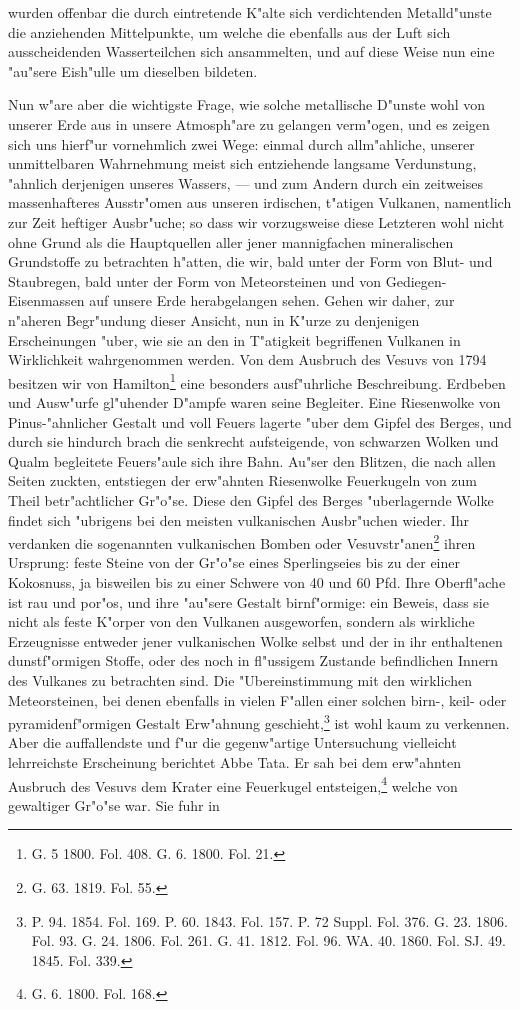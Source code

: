 \documentclass[a4paper, 8pt, oneside, polutonikogreek, german]{article}
\begin{document}
wurden offenbar die durch eintretende K"alte sich verdichtenden Metalld"unste die anziehenden Mittelpunkte, um welche die ebenfalls aus der Luft sich ausscheidenden Wasserteilchen sich ansammelten, und auf diese Weise nun eine "au"sere Eish"ulle um dieselben bildeten.

Nun w"are aber die wichtigste Frage, wie solche metallische D"unste wohl von unserer Erde aus in unsere Atmosph"are zu gelangen verm"ogen, und es zeigen sich uns hierf"ur vornehmlich zwei Wege: einmal durch allm"ahliche, unserer unmittelbaren Wahrnehmung meist sich entziehende langsame Verdunstung, "ahnlich derjenigen unseres Wassers, --- und zum Andern durch ein zeitweises massenhafteres Ausstr"omen aus unseren irdischen, t"atigen Vulkanen, namentlich zur Zeit heftiger Ausbr"uche; so dass wir vorzugsweise diese Letzteren wohl nicht ohne Grund als die Hauptquellen aller jener mannigfachen mineralischen Grundstoffe zu betrachten h"atten, die wir, bald unter der Form von Blut- und Staubregen, bald unter der Form von Meteorsteinen und von Gediegen-Eisenmassen auf unsere Erde herabgelangen sehen. Gehen wir daher, zur n"aheren Begr"undung dieser Ansicht, nun in K"urze zu denjenigen Erscheinungen "uber, wie sie an den in T"atigkeit begriffenen Vulkanen in Wirklichkeit wahrgenommen werden. Von dem Ausbruch des Vesuvs von 1794 besitzen wir von Hamilton\footnote{G. 5 1800. Fol. 408. G. 6. 1800. Fol. 21.} eine besonders ausf"uhrliche Beschreibung. Erdbeben und Ausw"urfe gl"uhender D"ampfe waren seine Begleiter. Eine Riesenwolke von Pinus-"ahnlicher Gestalt und voll Feuers lagerte "uber dem Gipfel des Berges, und durch sie hindurch brach die senkrecht aufsteigende, von schwarzen Wolken und Qualm begleitete Feuers"aule sich ihre Bahn. Au"ser den Blitzen, die nach allen Seiten zuckten, entstiegen der erw"ahnten Riesenwolke Feuerkugeln von zum Theil betr"achtlicher Gr"o"se. Diese den Gipfel des Berges "uberlagernde Wolke findet sich "ubrigens bei den meisten vulkanischen Ausbr"uchen wieder. Ihr verdanken die sogenannten vulkanischen Bomben oder Vesuvstr"anen\footnote{G. 63. 1819. Fol. 55.} ihren Ursprung: feste Steine von der Gr"o"se eines Sperlingseies bis zu der einer Kokosnuss, ja bisweilen bis zu einer Schwere von 40 und 60 Pfd. Ihre Oberfl"ache ist rau und por"os, und ihre "au"sere Gestalt birnf"ormige: ein Beweis, dass sie nicht als feste K"orper von den Vulkanen ausgeworfen, sondern als wirkliche Erzeugnisse entweder jener vulkanischen Wolke selbst und der in ihr enthaltenen dunstf"ormigen Stoffe, oder des noch in fl"ussigem Zustande befindlichen Innern des Vulkanes zu betrachten sind. Die "Ubereinstimmung mit den wirklichen Meteorsteinen, bei denen ebenfalls in vielen F"allen einer solchen birn-, keil- oder pyramidenf"ormigen Gestalt Erw"ahnung geschieht,\footnote{P. 94. 1854. Fol. 169. P. 60. 1843. Fol. 157. P. 72 Suppl. Fol. 376. G. 23. 1806. Fol. 93. G. 24. 1806. Fol. 261. G. 41. 1812. Fol. 96. WA. 40. 1860. Fol. SJ. 49. 1845. Fol. 339.} ist wohl kaum zu verkennen. Aber die auffallendste und f"ur die gegenw"artige Untersuchung vielleicht lehrreichste Erscheinung berichtet Abbe Tata. Er sah bei dem erw"ahnten Ausbruch des Vesuvs dem Krater eine Feuerkugel entsteigen,\footnote{G. 6. 1800. Fol. 168.} welche von gewaltiger Gr"o"se war. Sie fuhr in 
\end{document}
